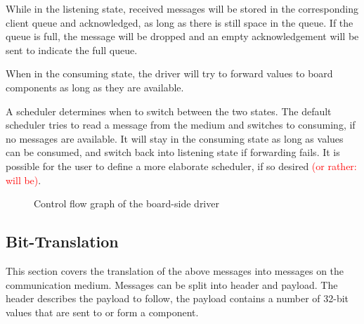 \documentclass{report}
\begin{document}
While in the listening state, received messages will be stored in the corresponding client queue and acknowledged, as long as there is still space in the queue. If the queue is full, the message will be dropped and an empty acknowledgement will be sent to indicate the full queue.

When in the consuming state, the driver will try to forward values to board components as long as they are available.

A scheduler determines when to switch between the two states. The default scheduler tries to read a message from the medium and switches to consuming, if no messages are available. It will stay in the consuming state as long as values can be consumed, and switch back into listening state if forwarding fails. It is possible for the user to define a more elaborate scheduler, if so desired \textcolor{red}{(or rather: will be)}.

\begin{figure}[h]
\centering
{}
\label{fig:cfg:board}
\caption{Control flow graph of the board-side driver}
\end{figure}

\subsection{Bit-Translation}
This section covers the translation of the above messages into messages on the communication medium. Messages can be split into header and payload. The header describes the payload to follow, the payload contains a number of 32-bit values that are sent to or form a component.
\end{document}
